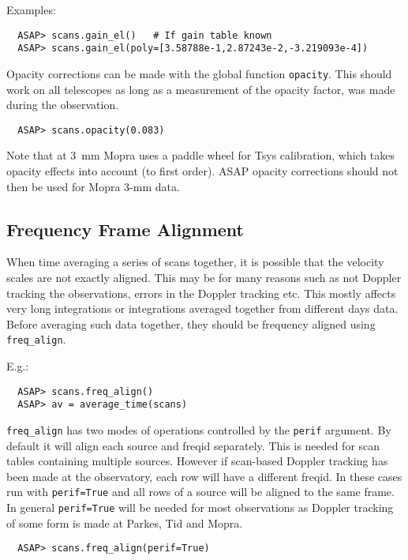 \documentclass[11pt]{article}
\newcommand{\cmd}[1]{{\tt #1}}
\begin{document}
Examples:

\begin{verbatim}
  ASAP> scans.gain_el()   # If gain table known
  ASAP> scans.gain_el(poly=[3.58788e-1,2.87243e-2,-3.219093e-4])
\end{verbatim}

Opacity corrections can be made with the global function
\cmd{opacity}. This should work on all telescopes as long as a
measurement of the opacity factor, was made during the
observation.

\begin{verbatim}
  ASAP> scans.opacity(0.083)
\end{verbatim}

Note that at 3~mm Mopra uses a paddle wheel for Tsys calibration,
which takes opacity effects into account (to first order). ASAP
opacity corrections should not then be used for Mopra 3-mm data.

\subsection{Frequency Frame Alignment}

When time averaging a series of scans together, it is possible that the
velocity scales are not exactly aligned.  This may be for many reasons
such as not Doppler tracking the observations, errors in the Doppler
tracking etc.  This mostly affects very long integrations or
integrations averaged together from different days data.  Before
averaging such data together, they should be frequency aligned using
\cmd{freq\_align}. 

E.g.:

\begin{verbatim}
  ASAP> scans.freq_align()
  ASAP> av = average_time(scans)
\end{verbatim}

\cmd{freq\_align} has two modes of operations controlled by the
\cmd{perif} argument. By default it will align each source and freqid
separately. This is needed for scan tables containing multiple
sources. However if scan-based Doppler tracking has been made at the observatory,
each row will have a different freqid. In these cases run with
\cmd{perif=True} and all rows of a source will be aligned to the same
frame. In general \cmd{perif=True} will be needed for most
observations as Doppler tracking of some form is made at Parkes, Tid
and Mopra.

\begin{verbatim}
  ASAP> scans.freq_align(perif=True)
\end{verbatim}
\end{document}
